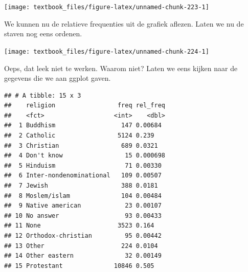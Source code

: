 \documentclass[]{tufte-book}
\newenvironment{Shaded}{}{}
\newcommand{\DataTypeTok}[1]{\textcolor[rgb]{0.56,0.13,0.00}{#1}}
\newcommand{\KeywordTok}[1]{\textcolor[rgb]{0.00,0.44,0.13}{\textbf{#1}}}
\newcommand{\NormalTok}[1]{#1}
\newcommand{\OperatorTok}[1]{\textcolor[rgb]{0.40,0.40,0.40}{#1}}
\newcommand{\StringTok}[1]{\textcolor[rgb]{0.25,0.44,0.63}{#1}}
\begin{document}
\texttt{[image: textbook\_files/figure-latex/unnamed-chunk-223-1]}

We kunnen nu de relatieve frequenties uit de grafiek aflezen. Laten we nu de staven nog eens ordenen.

\begin{Shaded}
\end{Shaded}

\texttt{[image: textbook\_files/figure-latex/unnamed-chunk-224-1]}

Oeps, dat leek niet te werken. Waarom niet? Laten we eens kijken naar de gegevens die we aan ggplot gaven.

\begin{Shaded}
\end{Shaded}

\begin{verbatim}
## # A tibble: 15 x 3
##    religion                 freq rel_freq
##    <fct>                   <int>    <dbl>
##  1 Buddhism                  147 0.00684 
##  2 Catholic                 5124 0.239   
##  3 Christian                 689 0.0321  
##  4 Don't know                 15 0.000698
##  5 Hinduism                   71 0.00330 
##  6 Inter-nondenominational   109 0.00507 
##  7 Jewish                    388 0.0181  
##  8 Moslem/islam              104 0.00484 
##  9 Native american            23 0.00107 
## 10 No answer                  93 0.00433 
## 11 None                     3523 0.164   
## 12 Orthodox-christian         95 0.00442 
## 13 Other                     224 0.0104  
## 14 Other eastern              32 0.00149 
## 15 Protestant              10846 0.505
\end{verbatim}
\end{document}
